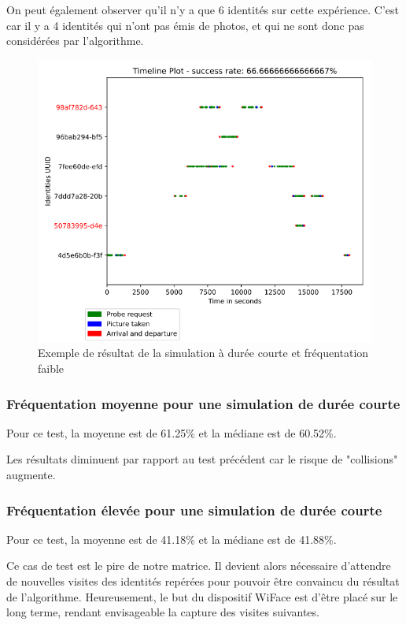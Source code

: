 On peut également observer qu'il n'y a que 6 identités sur cette expérience. C'est car il y a 4 identités
qui n'ont pas émis de photos, et qui ne sont donc pas considérées par l'algorithme.

\begin{figure}[H]
	\centering
	\includegraphics[width=12cm]{images/tests/exemple_courte_faible.png}
	\caption{Exemple de résultat de la simulation à durée courte et fréquentation faible}
	\label{fig:simulation-short-low}
\end{figure}

\subsubsection{Fréquentation moyenne pour une simulation de durée courte}
Pour ce test, la moyenne est de 61.25\% et la médiane est de 60.52\%.

Les résultats diminuent par rapport au test précédent car le risque de "collisions" augmente.

\subsubsection{Fréquentation élevée pour une simulation de durée courte}
Pour ce test, la moyenne est de 41.18\% et la médiane est de 41.88\%.

Ce cas de test est le pire de notre matrice. Il devient alors nécessaire d'attendre de nouvelles visites des identités
repérées pour pouvoir être convaincu du résultat de l'algorithme. Heureusement, le but du dispositif WiFace est d'être placé sur le long terme, rendant envisageable la capture des
visites suivantes.

